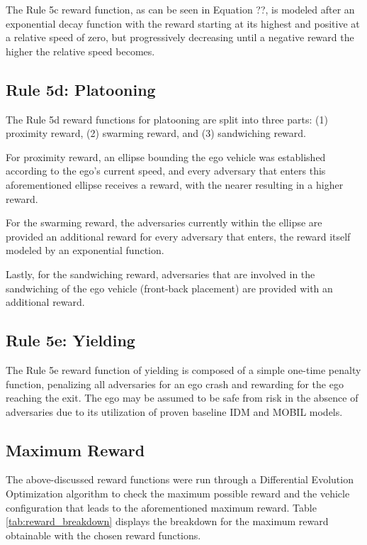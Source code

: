 \documentclass[12pt, a4paper]{report}
\begin{document}
The Rule 5c reward function, as can be seen in Equation ??, is modeled after an exponential decay function with the reward starting at its highest and positive at a relative speed of zero, but progressively decreasing until a negative reward the higher the relative speed becomes.

\subsection{Rule 5d: Platooning}

The Rule 5d reward functions for platooning are split into three parts: (1) proximity reward, (2) swarming reward, and (3) sandwiching reward.

For proximity reward, an ellipse bounding the ego vehicle was established according to the ego’s current speed, and every adversary that enters this aforementioned ellipse receives a reward, with the nearer resulting in a higher reward.

For the swarming reward, the adversaries currently within the ellipse are provided an additional reward for every adversary that enters, the reward itself modeled by an exponential function.

Lastly, for the sandwiching reward, adversaries that are involved in the sandwiching of the ego vehicle (front-back placement) are provided with an additional reward.

\subsection{Rule 5e: Yielding}

The Rule 5e reward function of yielding is composed of a simple one-time penalty function, penalizing all adversaries for an ego crash and rewarding for the ego reaching the exit. The ego may be assumed to be safe from risk in the absence of adversaries due to its utilization of proven baseline IDM and MOBIL models.

\subsection{Maximum Reward}

The above-discussed reward functions were run through a Differential Evolution Optimization algorithm to check the maximum possible reward and the vehicle configuration that leads to the aforementioned maximum reward. Table \ref{tab:reward_breakdown} displays the breakdown for the maximum reward obtainable with the chosen reward functions.
\end{document}

